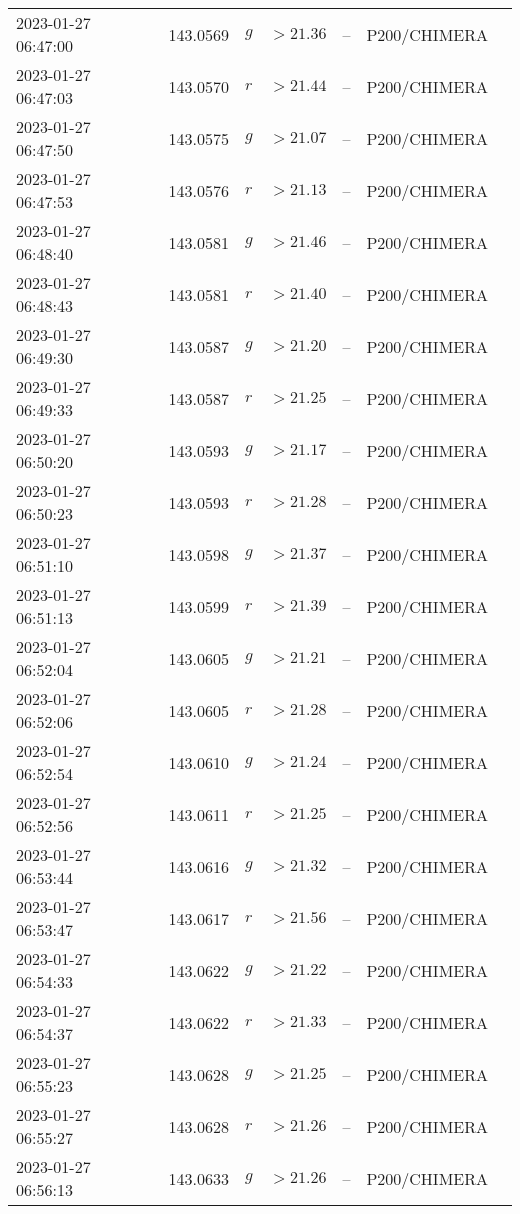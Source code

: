 \documentclass{nature_plusfigure}
\begin{document}
\begin{supplement}
\begin{center}
\begin{longtable}{lllllll}
2023-01-27 06:47:00 & 143.0569 & $g$ & $>21.36$ & -- & P200/CHIMERA &  \\ 
2023-01-27 06:47:03 & 143.0570 & $r$ & $>21.44$ & -- & P200/CHIMERA &  \\ 
2023-01-27 06:47:50 & 143.0575 & $g$ & $>21.07$ & -- & P200/CHIMERA &  \\ 
2023-01-27 06:47:53 & 143.0576 & $r$ & $>21.13$ & -- & P200/CHIMERA &  \\ 
2023-01-27 06:48:40 & 143.0581 & $g$ & $>21.46$ & -- & P200/CHIMERA &  \\ 
2023-01-27 06:48:43 & 143.0581 & $r$ & $>21.40$ & -- & P200/CHIMERA &  \\ 
2023-01-27 06:49:30 & 143.0587 & $g$ & $>21.20$ & -- & P200/CHIMERA &  \\ 
2023-01-27 06:49:33 & 143.0587 & $r$ & $>21.25$ & -- & P200/CHIMERA &  \\ 
2023-01-27 06:50:20 & 143.0593 & $g$ & $>21.17$ & -- & P200/CHIMERA &  \\ 
2023-01-27 06:50:23 & 143.0593 & $r$ & $>21.28$ & -- & P200/CHIMERA &  \\ 
2023-01-27 06:51:10 & 143.0598 & $g$ & $>21.37$ & -- & P200/CHIMERA &  \\ 
2023-01-27 06:51:13 & 143.0599 & $r$ & $>21.39$ & -- & P200/CHIMERA &  \\ 
2023-01-27 06:52:04 & 143.0605 & $g$ & $>21.21$ & -- & P200/CHIMERA &  \\ 
2023-01-27 06:52:06 & 143.0605 & $r$ & $>21.28$ & -- & P200/CHIMERA &  \\ 
2023-01-27 06:52:54 & 143.0610 & $g$ & $>21.24$ & -- & P200/CHIMERA &  \\ 
2023-01-27 06:52:56 & 143.0611 & $r$ & $>21.25$ & -- & P200/CHIMERA &  \\ 
2023-01-27 06:53:44 & 143.0616 & $g$ & $>21.32$ & -- & P200/CHIMERA &  \\ 
2023-01-27 06:53:47 & 143.0617 & $r$ & $>21.56$ & -- & P200/CHIMERA &  \\ 
2023-01-27 06:54:33 & 143.0622 & $g$ & $>21.22$ & -- & P200/CHIMERA &  \\ 
2023-01-27 06:54:37 & 143.0622 & $r$ & $>21.33$ & -- & P200/CHIMERA &  \\ 
2023-01-27 06:55:23 & 143.0628 & $g$ & $>21.25$ & -- & P200/CHIMERA &  \\ 
2023-01-27 06:55:27 & 143.0628 & $r$ & $>21.26$ & -- & P200/CHIMERA &  \\ 
2023-01-27 06:56:13 & 143.0633 & $g$ & $>21.26$ & -- & P200/CHIMERA &  \\ 

\end{longtable}
\end{center}
\end{supplement}
\end{document}
